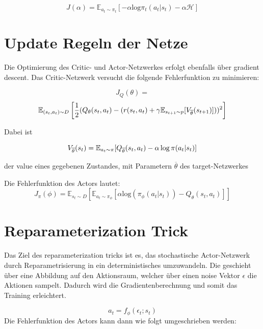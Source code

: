 \documentclass[8pt]{article}
\begin{document}
\begin{multicols}{2}
\begin{equation}
J(\alpha)=\mathbb{E}_{a_{t}\sim\pi_{t}}\left[-\alpha \mathrm{log}\pi_{t}(a_{t}|s_{t})-\alpha \mathcal{H}\right]
\end{equation}

\section{Update Regeln der Netze}
Die Optimierung des Critic- und Actor-Netzwerkes erfolgt ebenfalls über gradient descent. Das Critic-Netzwerk versucht die folgende Fehlerfunktion zu minimieren:

\begin{equation}
J_{Q}(\theta)=
\end{equation}
\begin{equation}
\mathbb{E}_{(s_{t},a_{t})\sim D}\left[\frac{1}{2}(Q_{\theta}(s_{t},a_{t})-(r(s_{t},a_{t})+\gamma \mathbb{E}_{s_{t+1}\sim p}[V_{\overline{\theta}}(s_{t+1})]))^{2}\right]\notag
\end{equation}

Dabei ist

\begin{equation}
	\mathnormal{V}_{\overline{\theta}}(s_{t}) = \mathbb{E}_{a_t \sim \pi}[\mathnormal{Q}_{\overline{\theta}}(s_t, a_t) - \alpha \, \mathrm{log} \, \pi (a_t|s_t)]
\end{equation}

der value eines gegebenen Zustandes, mit Parametern $\overline{\theta}$ des target-Netzwerkes

Die Fehlerfunktion des Actors lautet:
\begin{equation}
J_{\pi}(\phi)=\mathbb{E}_{s_{t}\sim D}\left[\mathbb{E}_{a_{t}\sim \pi_{\phi}}\left[\alpha \mathrm{log}(\pi_{\phi}(a_{t}|s_{t}))-Q_{\theta}(s_{t},a_{t})\right]\right]
\end{equation}

\section{Reparameterization Trick}
Das Ziel des reparameterization tricks ist es, das stochastische Actor-Netzwerk durch Reparametrisierung in ein deterministisches umzuwandeln. Die geschieht über eine Abbildung auf den Aktionsraum, welcher über einen noise Vektor $\epsilon$ die Aktionen sampelt. Dadurch wird die Gradientenberechnung und somit das Training erleichtert.

\begin{equation}
a_{t}=f_{\phi}(\epsilon_{t};s_{t})
\end{equation}
Die Fehlerfunktion des Actors kann dann wie folgt umgeschrieben werden:


\end{multicols}
\end{document}
